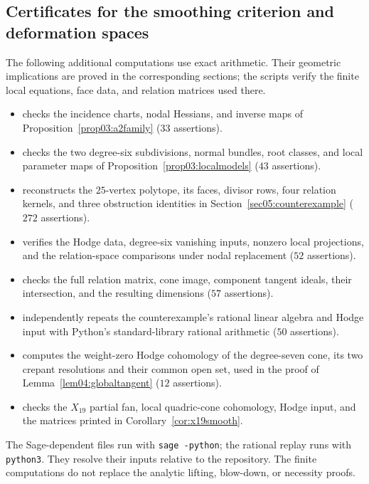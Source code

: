 \documentclass[11pt]{amsart}
\theoremstyle{definition}
\theoremstyle{remark}
\theoremstyle{plain}
\begin{document}
\subsection{Certificates for the smoothing criterion and deformation spaces}
The following additional computations use exact arithmetic.  Their
geometric implications are proved in the corresponding sections;
the scripts verify the finite local equations, face data, and
relation matrices used there.
\begin{itemize}
\item {} checks the incidence
charts, nodal Hessians, and inverse maps of
Proposition~\ref{prop03:a2family} ($33$ assertions).
\item {} checks the two degree-six
subdivisions, normal bundles, root classes, and local parameter maps
of Proposition~\ref{prop03:localmodels} ($43$ assertions).
\item {} reconstructs the
$25$-vertex polytope, its faces, divisor rows, four relation kernels,
and three obstruction identities in Section~\ref{sec05:counterexample}
($272$ assertions).
\item {} verifies the Hodge data,
degree-six vanishing inputs, nonzero local projections, and the
relation-space comparisons under nodal replacement ($52$ assertions).
\item {} checks the full
relation matrix, cone image, component tangent ideals, their
intersection, and the resulting dimensions ($57$ assertions).
\item {} independently
repeats the counterexample's rational linear algebra and Hodge
input with Python's standard-library rational arithmetic
($50$ assertions).
\item {} computes the weight-zero Hodge cohomology
of the degree-seven cone, its two crepant resolutions and their common open
set, used in the proof of Lemma~\ref{lem04:globaltangent} ($12$ assertions).
\item {} checks the $X_{19}$
partial fan, local quadric-cone cohomology, Hodge input, and the
matrices printed in Corollary~\ref{cor:x19smooth}.
\end{itemize}
The Sage-dependent files run with \texttt{sage -python}; the rational
replay runs with \texttt{python3}.  They resolve their inputs relative
to the repository.  The finite computations do not replace the
analytic lifting, blow-down, or necessity proofs.
\end{document}
